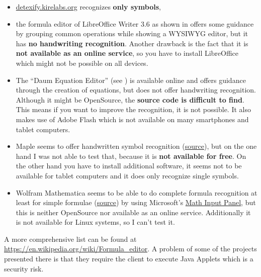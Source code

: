 \documentclass[a4paper]{scrartcl}
\begin{document}
    \begin{itemize}
        \item \href{http://detexify.kirelabs.org/classify.html}{detexify.kirelabs.org}
              recognizes \textbf{only symbols},
        \item the formula editor of LibreOffice Writer 3.6 as shown
              in  offers some
              guidance by grouping common operations while showing
              a WYSIWYG editor, but it has \textbf{no handwriting recognition}.
              Another drawback is the fact that it is \textbf{not available
              as an online service}, so you have to install LibreOffice
              which might not be possible on all devices.
        \item The \enquote{Daum Equation Editor} (see ) is available online
              and offers guidance through the creation of equations,
              but does not offer handwriting recognition. Although
              it might be OpenSource, the \textbf{source code is difficult to
              find}. This means if you want to improve the recognition,
              it is not possible. It also makes use of Adobe Flash
              which is not available on many smartphones and tablet
              computers.
        \item Maple seems to offer handwritten symbol recognition (\href{http://www.maplesoft.com/products/maple/features/handwritten.aspx}{source}),
              but on the one hand I was not able to test that, because
              it is \textbf{not available for free}. On the other hand you
              have to install additional software, it seems not to be
              available for tablet computers and it does only recognize
              single symbols.
        \item Wolfram Mathematica seems to be able to do complete
              formula recognition at least for simple formulae (\href{http://reference.wolfram.com/mathematica/tutorial/HandwrittenMathRecognition.html}{source})
              by using Microsoft's \href{http://windows.microsoft.com/en-ph/windows7/use-math-input-panel-to-write-and-correct-math-equations}{Math Input Panel},
              but this is neither OpenSource nor available as an
              online service. Additionally it is not
              available for Linux systems, so I can't test it.
    \end{itemize}

    A more comprehensive list can be found at \href{https://en.wikipedia.org/wiki/Formula_editor}{https://en.wikipedia.org/wiki/Formula\_editor}.
    A problem of some of the projects presented there is that they
    require the client to execute Java Applets which is a security
    risk.
\end{document}
